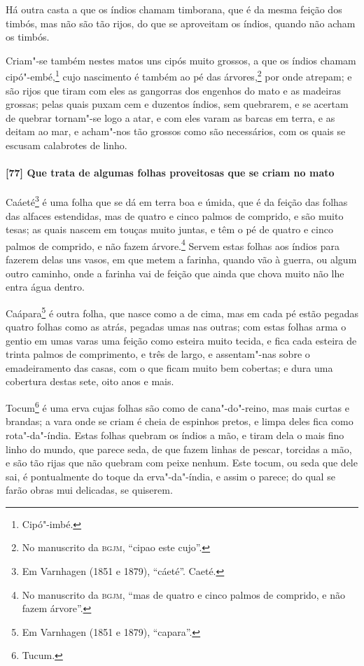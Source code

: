\begin{linenumbers}
Há outra casta a que os índios chamam timborana, que é da mesma feição dos timbós, mas não
são tão rijos, do que se aproveitam os índios, quando não acham os timbós.

Criam"-se também nestes matos uns cipós muito grossos, a que os índios chamam
cipó"-embé,\footnote{ Cipó"-imbé.} cujo nascimento é também ao pé das árvores,\footnote{ No
manuscrito da \textsc{bgjm}, ``cipao este cujo''.} por onde atrepam; e são rijos que tiram
com eles as gangorras dos engenhos do mato e as madeiras grossas; pelas quais puxam cem e
duzentos índios, sem quebrarem, e se acertam de quebrar tornam"-se logo a atar, e com eles
varam as barcas em terra, e as deitam ao mar, e acham"-nos tão grossos como são
necessários, com os quais se escusam calabrotes de linho.

\paragraph{[77] Que trata de algumas folhas proveitosas que se criam no mato}\quad
Caáeté\footnote{ Em Varnhagen (1851 e 1879), ``cáeté''. Caeté.} é uma folha que se dá em
terra boa e úmida, que é da feição das folhas das alfaces estendidas, mas de quatro e
cinco palmos de comprido, e são muito tesas; as quais nascem em touças muito juntas, e têm
o pé de quatro e cinco palmos de comprido, e não fazem árvore.\footnote{ No manuscrito da
\textsc{bgjm}, ``mas de quatro e cinco palmos de comprido, e não fazem árvore''.} Servem
estas folhas aos índios para fazerem delas uns vasos, em que metem a farinha, quando vão à
guerra, ou algum outro caminho, onde a farinha vai de feição que ainda que chova muito não
lhe entra água dentro.

Caápara\footnote{ Em Varnhagen (1851 e 1879), ``capara''.} é outra folha, que nasce como a
de cima, mas em cada pé estão pegadas quatro folhas como as atrás, pegadas umas nas
outras; com estas folhas arma o gentio em umas varas uma feição como esteira muito tecida,
e fica cada esteira de trinta palmos de comprimento, e três de largo, e assentam"-nas sobre
o emadeiramento das casas, com o que ficam muito bem cobertas; e dura uma cobertura destas
sete, oito anos e mais.

Tocum\footnote{ Tucum.} é uma erva cujas folhas são como de cana"-do"-reino, mas mais curtas
e brandas; a vara onde se criam é cheia de espinhos pretos, e limpa deles fica como
rota"-da"-índia. Estas folhas quebram os índios a mão, e tiram dela o mais fino linho do
mundo, que parece seda, de que fazem linhas de pescar, torcidas a mão, e são tão rijas que
não quebram com peixe nenhum. Este tocum, ou seda que dele sai, é pontualmente do toque da
erva"-da"-índia, e assim o parece; do qual se farão obras mui delicadas, se quiserem.


\end{linenumbers}
